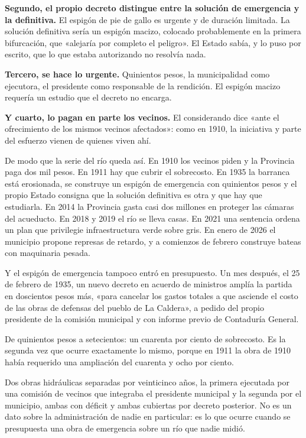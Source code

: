\textbf{Segundo, el propio decreto distingue entre la solución de emergencia y la
definitiva.} El espigón de pie de gallo es urgente y de duración limitada. La solución
definitiva sería un espigón macizo, colocado probablemente en la primera bifurcación, que
«alejaría por completo el peligro». El Estado sabía, y lo puso por escrito, que lo que
estaba autorizando no resolvía nada.

\textbf{Tercero, se hace lo urgente.} Quinientos pesos, la municipalidad como ejecutora, el
presidente como responsable de la rendición. El espigón macizo requería un estudio que el
decreto no encarga.

\textbf{Y cuarto, lo pagan en parte los vecinos.} El considerando dice «ante el ofrecimiento
de los mismos vecinos afectados»: como en 1910, la iniciativa y parte del esfuerzo vienen de
quienes viven ahí.

De modo que la serie del río queda así. En 1910 los vecinos piden y la Provincia paga dos
mil pesos. En 1911 hay que cubrir el sobrecosto. En 1935 la barranca está erosionada, se
construye un espigón de emergencia con quinientos pesos y el propio Estado consigna que la
solución definitiva es otra y que hay que estudiarla. En 2014 la Provincia gasta casi dos
millones en proteger las cámaras del acueducto. En 2018 y 2019 el río se lleva casas. En
2021 una sentencia ordena un plan que privilegie infraestructura verde sobre gris. En enero
de 2026 el municipio propone represas de retardo, y a comienzos de febrero construye bateas con maquinaria pesada.

Y el espigón de emergencia tampoco entró en presupuesto. Un mes después, el 25 de febrero
de 1935, un nuevo decreto en acuerdo de ministros amplía la partida en doscientos pesos
más, «para cancelar los gastos totales a que asciende el costo de las obras de defensas del
pueblo de La Caldera», a pedido del propio presidente de la comisión municipal y con informe
previo de Contaduría General.

De quinientos pesos a setecientos: un cuarenta por ciento de sobrecosto. Es la segunda vez
que ocurre exactamente lo mismo, porque en 1911 la obra de 1910 había requerido una
ampliación del cuarenta y ocho por ciento.

Dos obras hidráulicas separadas por veinticinco años, la primera ejecutada por una comisión de vecinos que integraba el presidente municipal y la segunda por el municipio,
ambas con déficit y ambas cubiertas por decreto posterior. No es un dato sobre la
administración de nadie en particular: es lo que ocurre cuando se presupuesta una obra de
emergencia sobre un río que nadie midió.

